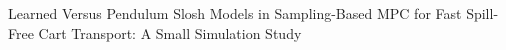 Learned Versus Pendulum Slosh Models in Sampling-Based MPC for Fast Spill-Free Cart Transport: A Small Simulation Study
